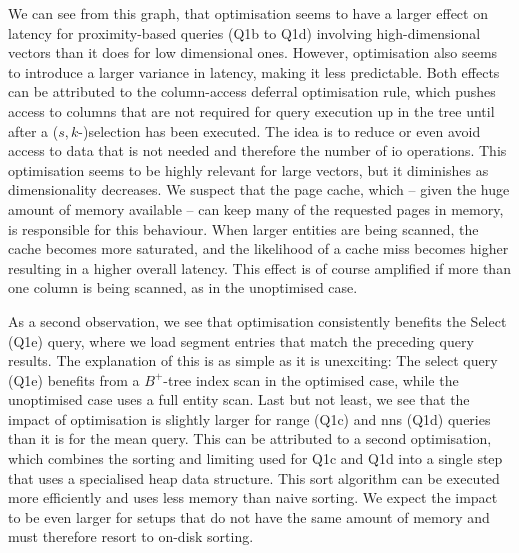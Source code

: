 We can see from this graph, that optimisation seems to have a larger effect on latency for proximity-based queries (Q1b to Q1d) involving high-dimensional vectors than it does for low dimensional ones. However, optimisation also seems to introduce a larger variance in latency, making it less predictable. Both effects can be attributed to the column-access deferral optimisation rule, which pushes access to columns that are not required for query execution up in the tree until after a ($s,k$-)selection has been executed. The idea is to reduce or even avoid access to data that is not needed and therefore the number of \acrshort{io} operations. This optimisation seems to be highly relevant for large vectors, but it diminishes as dimensionality decreases. We suspect that the page cache, which -- given the huge amount of memory available -- can keep many of the requested pages in memory, is responsible for this behaviour. When larger entities are being scanned, the cache becomes more saturated, and the likelihood of a cache miss becomes higher resulting in a higher overall latency. This effect is of course amplified if more than one column is being scanned, as in the unoptimised case.

As a second observation, we see that optimisation consistently benefits the Select (Q1e) query, where we load segment entries that match the preceding query results. The explanation of this is as simple as it is unexciting: The select query (Q1e) benefits from a $B^{+}$-tree index scan in the optimised case, while the unoptimised case uses a full entity scan. Last but not least, we see that the impact of optimisation is slightly larger for range (Q1c) and \acrshort{nns} (Q1d) queries than it is for the mean query. This can be attributed to a second optimisation, which combines the sorting and limiting used for Q1c and Q1d into a single step that uses a specialised heap data structure. This sort algorithm can be executed more efficiently and uses less memory than naive sorting. We expect the impact to be even larger for setups that do not have the same amount of memory and must therefore resort to on-disk sorting.

\newpage

